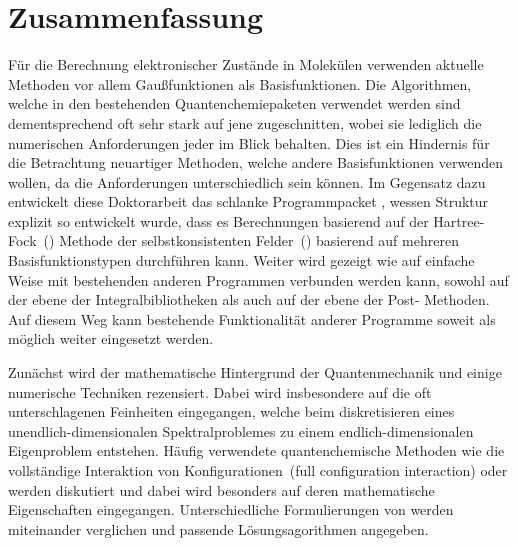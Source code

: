 %
%
\chapter*{Zusammenfassung}
{}

Für die Berechnung elektronischer Zustände in Molekülen
verwenden aktuelle Methoden vor allem Gaußfunktionen als Basisfunktionen.
Die Algorithmen, welche in den bestehenden Quantenchemiepaketen
verwendet werden sind dementsprechend oft sehr stark
auf jene zugeschnitten,
wobei sie lediglich die numerischen Anforderungen jeder im Blick behalten.
Dies ist ein Hindernis für die Betrachtung neuartiger Methoden,
welche andere Basisfunktionen verwenden wollen,
da die Anforderungen unterschiedlich sein können.
Im Gegensatz  dazu entwickelt diese Doktorarbeit
das schlanke Programmpacket \molsturm,
wessen Struktur explizit so entwickelt wurde,
dass es Berechnungen
basierend auf der Hartree-Fock~(\HF) Methode der selbstkonsistenten Felder~(\SCF)
basierend auf mehreren Basisfunktionstypen durchführen kann.
Weiter wird gezeigt wie \molsturm
auf einfache Weise mit bestehenden anderen Programmen
verbunden werden kann,
sowohl auf der ebene der Integralbibliotheken als auch auf der ebene der Post-\HF
Methoden.
Auf diesem Weg kann bestehende Funktionalität anderer Programme
soweit als möglich weiter eingesetzt werden.

Zunächst wird der mathematische Hintergrund der Quantenmechanik
und einige numerische Techniken rezensiert.
Dabei wird insbesondere auf die oft unterschlagenen Feinheiten
eingegangen,
welche beim diskretisieren eines unendlich-dimensionalen Spektralproblemes
zu einem endlich-dimensionalen Eigenproblem entstehen.
Häufig verwendete quantenchemische Methoden
wie die vollständige Interaktion von Konfigurationen~(full configuration interaction)
oder \HF werden diskutiert
und dabei wird besonders auf deren mathematische Eigenschaften
eingegangen.
Unterschiedliche Formulierungen von \HF werden miteinander verglichen
und passende \SCF Lösungsagorithmen angegeben.


